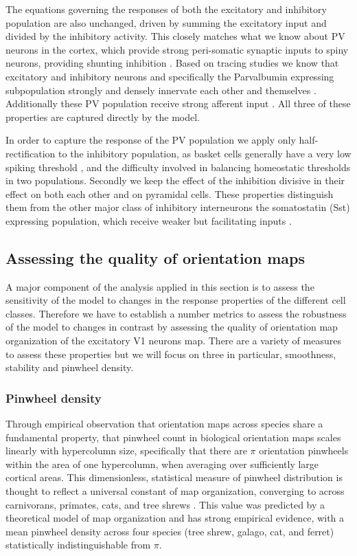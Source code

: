 The equations governing the responses of both the excitatory and
inhibitory population are also unchanged, driven by summing the
excitatory input and divided by the inhibitory activity. This closely
matches what we know about PV neurons in the cortex, which provide
strong peri-somatic synaptic inputs to spiny neurons, providing
shunting inhibition \citep{Atallah2012, Wilson2012}. Based on tracing studies we
know that excitatory and inhibitory neurons and specifically the
Parvalbumin expressing subpopulation strongly and densely innervate
each other and themselves \citep{Buzas2001, Ma2011,
  Pfeffer2013}. Additionally these PV population receive strong
afferent input \citep{Burkhalter2008}. All three of these properties
are captured directly by the model.

In order to capture the response of the PV population we apply only
half-rectification to the inhibitory population, as basket cells
generally have a very low spiking threshold \citep{Ma2011}, and the
difficulty involved in balancing homeostatic thresholds in two
populations. Secondly we keep the effect of the inhibition divisive in
their effect on both each other and on pyramidal cells. These
properties distinguish them from the other major class of inhibitory
interneurons the somatostatin (Sst) expressing population, which
receive weaker but facilitating inputs
\citep{Beierlein2003,Bartley2008,Tan2008}.

\subsection{Assessing the quality of orientation maps} \label{metrics}

A major component of the analysis applied in this section is to assess
the sensitivity of the model to changes in the response properties of
the different cell classes. Therefore we have to establish a number
metrics to assess the robustness of the model to changes in contrast
by assessing the quality of orientation map organization of the
excitatory V1 neurons map. There are a variety of measures to assess
these properties but we will focus on three in particular, smoothness,
stability and pinwheel density.

\subsubsection{Pinwheel density}

Through empirical observation that orientation maps across species
share a fundamental property, that pinwheel count in biological
orientation maps scales linearly with hypercolumn size, specifically
that there are $\pi$ orientation pinwheels within the area of one
hypercolumn, when averaging over sufficiently large cortical
areas. This dimensionless, statistical measure of pinwheel
distribution is thought to reflect a universal constant of map
organization, converging to across carnivorans, primates, cats, and
tree shrews \citep{Kaschube2010, Keil2012}. This value was predicted
by a theoretical model of map organization and has strong empirical
evidence, with a mean pinwheel density across four species (tree
shrew, galago, cat, and ferret) statistically indistinguishable from
$\pi$.

